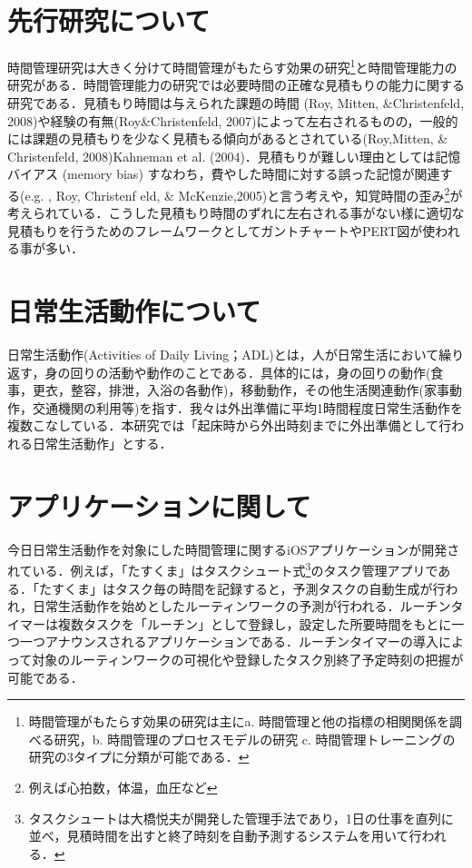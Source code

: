 \section{先行研究について}
時間管理研究は大きく分けて時間管理がもたらす効果の研究\footnote{時間管理がもたらす効果の研究は主にa. 時間管理と他の指標の相関関係を調べる研究，b. 時間管理のプロセスモデルの研究 c. 時間管理トレーニングの研究の3タイプに分類が可能である．}と時間管理能力の研究がある．時間管理能力の研究では必要時間の正確な見積もりの能力に関する研究である．見積もり時間は与えられた課題の時間 (Roy, Mitten, \&Christenfeld, 2008)や経験の有無(Roy\&Christenfeld, 2007)によって左右されるものの，一般的には課題の見積もりを少なく見積もる傾向があるとされている(Roy,Mitten, \& Christenfeld, 2008)Kahneman et al. (2004)．見積もりが難しい理由としては記憶バイアス (memory bias) すなわち，費やした時間に対する誤った記憶が関連する(e.g. , Roy, Christenf eld, \& McKenzie,2005)と言う考えや，知覚時間の歪み\footnote{例えば心拍数\cite{MatudaHorie2011}\cite{MatudaIchikawa2015}，体温\cite{MatudaHorie2011}\cite{Hoagland1933}，血圧\cite{MatudaHorie2011}など}が考えられている．こうした見積もり時間のずれに左右される事がない様に適切な見積もりを行うためのフレームワークとしてガントチャートやPERT図が使われる事が多い．

\section{日常生活動作について}
日常生活動作(Activities of Daily Living；ADL)とは，人が日常生活において繰り返す，身の回りの活動や動作のことである．具体的には，身の回りの動作(食事，更衣，整容，排泄，入浴の各動作)，移動動作，その他生活関連動作(家事動作，交通機関の利用等)を指す\cite{Sakai2003}．我々は外出準備に平均1時間程度日常生活動作を複数こなしている\cite{duhouse}．本研究では「起床時から外出時刻までに外出準備として行われる日常生活動作」とする．

\section{アプリケーションに関して}
今日日常生活動作を対象にした時間管理に関するiOSアプリケーションが開発されている．例えば，「たすくま」はタスクシュート式\footnote{タスクシュートは大橋悦夫が開発した管理手法であり，1日の仕事を直列に並べ，見積時間を出すと終了時刻を自動予測するシステムを用いて行われる．}のタスク管理アプリである\cite{Taskuma}．「たすくま」はタスク毎の時間を記録すると，予測タスクの自動生成が行われ，日常生活動作を始めとしたルーティンワークの予測が行われる．ルーチンタイマーは複数タスクを「ルーチン」として登録し，設定した所要時間をもとに一つ一つアナウンスされるアプリケーションである\cite{RoutineTimer}．ルーチンタイマーの導入によって対象のルーティンワークの可視化や登録したタスク別終了予定時刻の把握が可能である．

